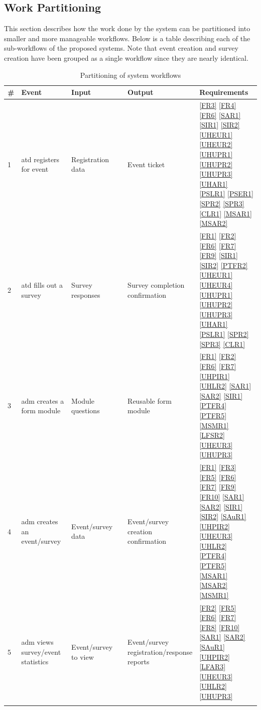 \documentclass[12pt]{article}
\begin{document}
\subsection{Work Partitioning}

This section describes how the work done by the system can be partitioned into smaller and more manageable workflows.
Below is a table describing each of the sub-workflows of the proposed systems. Note that event creation and survey
creation have been grouped as a single workflow since they are nearly identical.

{
  \setlength{\tabcolsep}{0.2em}
  \renewcommand{\arraystretch}{1.2}
\begin{longtable}[H]{p{0.03\linewidth}p{0.21\linewidth}p{0.25\linewidth}p{0.25\linewidth}p{0.28\linewidth}}
      \textbf{\#} & \textbf{Event} & \textbf{Input} & \textbf{Output} & \textbf{Requirements} \\ \hline
      1 & \Gls{atd} registers for event & Registration data & Event ticket & \ref{FR3} \ref{FR4} \ref{FR6} \ref{SAR1} \ref{SIR1} \ref{SIR2} \ref{UHEUR1} \ref{UHEUR2} \ref{UHUPR1} \ref{UHUPR2} \ref{UHUPR3} \ref{UHAR1} \ref{PSLR1} \ref{PSER1} \ref{SPR2} \ref{SPR3} \ref{CLR1} \ref{MSAR1} \ref{MSAR2} \\ \hline
      2 & \Gls{atd} fills out a survey & Survey responses & Survey completion confirmation & \ref{FR1} \ref{FR2} \ref{FR6} \ref{FR7} \ref{FR9} \ref{SIR1} \ref{SIR2} \ref{PTFR2} \ref{UHEUR1} \ref{UHEUR4} \ref{UHUPR1} \ref{UHUPR2} \ref{UHUPR3} \ref{UHAR1} \ref{PSLR1} \ref{SPR2} \ref{SPR3} \ref{CLR1} \\ \hline
      3 & \Gls{adm} creates a form module & Module questions & Reusable form module & \ref{FR1} \ref{FR2} \ref{FR6} \ref{FR7} \ref{UHPIR1} \ref{UHLR2} \ref{SAR1} \ref{SAR2} \ref{SIR1} \ref{PTFR4} \ref{PTFR5} \ref{MSMR1} \ref{LFSR2} \ref{UHEUR3} \ref{UHUPR3}\\ \hline
      4 & \Gls{adm} creates an event/survey & Event/survey data & Event/survey creation confirmation & \ref{FR1} \ref{FR3} \ref{FR5} \ref{FR6} \ref{FR7} \ref{FR9} \ref{FR10} \ref{SAR1} \ref{SAR2} \ref{SIR1} \ref{SIR2} \ref{SAuR1} \ref{UHPIR2} \ref{UHEUR3} \ref{UHLR2} \ref{PTFR4} \ref{PTFR5} \ref{MSAR1} \ref{MSAR2} \ref{MSMR1}\\ \hline
      5 & \Gls{adm} views survey/event statistics & Event/survey to view & Event/survey registration/response reports & \ref{FR2} \ref{FR5} \ref{FR6} \ref{FR7} \ref{FR8} \ref{FR10} \ref{SAR1} \ref{SAR2} \ref{SAuR1} \ref{UHPIR2} \ref{LFAR3} \ref{UHEUR3} \ref{UHLR2} \ref{UHUPR3}
      \\ \hline
    \caption{Partitioning of system workflows}\label{wfpart}
  \end{longtable}
}
\end{document}
